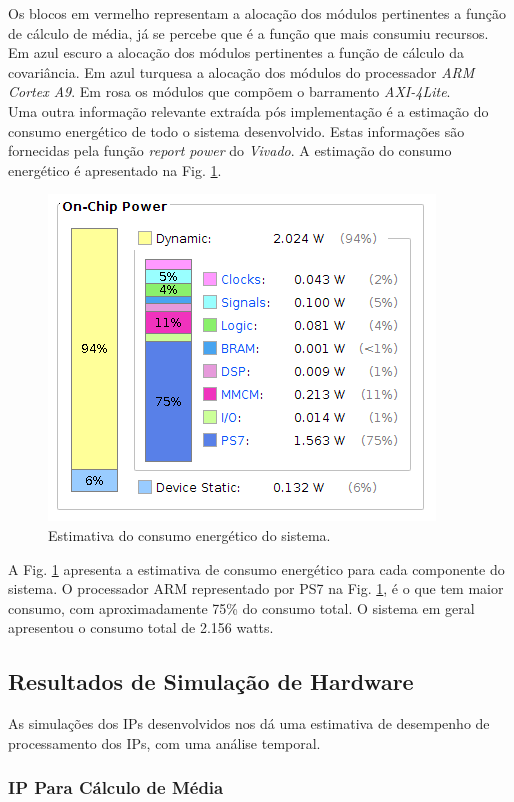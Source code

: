Os blocos em vermelho representam a alocação dos módulos pertinentes a função de cálculo de média, já se percebe que é a função que mais consumiu recursos. Em azul escuro a alocação dos módulos pertinentes a função de cálculo da covariância. Em azul turquesa a alocação dos módulos do processador \textit{ARM Cortex A9}. 
Em rosa os módulos que compõem o barramento \textit{AXI-4Lite}.\\
Uma outra informação relevante extraída pós implementação é a estimação do consumo energético de todo o sistema desenvolvido. Estas informações são fornecidas pela função \textit{report power} do \textit{Vivado}. A estimação do consumo energético é apresentado na Fig. \ref{power}.
\begin{figure}[!h]
	\centering
	\includegraphics[keepaspectratio=true,scale=0.5]{figuras/power.png}
	\caption{Estimativa do consumo energético do sistema.}
	\label{power}
\end{figure}

A Fig. \ref{power} apresenta a estimativa de consumo energético para cada componente do sistema. O processador ARM representado por PS7 na Fig. \ref{power}, é o que tem maior consumo, com aproximadamente 75\% do consumo total. O sistema em geral apresentou o consumo total de 2.156 watts.
 

\subsection{Resultados de Simulação de Hardware}
As simulações dos IPs desenvolvidos nos dá uma estimativa de desempenho de processamento dos IPs, com uma análise temporal. 

\subsubsection{IP Para Cálculo de Média}

